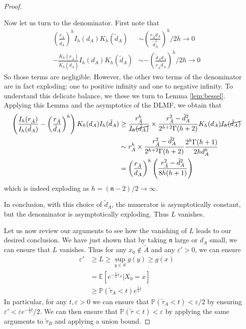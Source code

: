 \documentclass[english, aip, jcp, priprint, graphicx,floatfix]{revtex4-1}
\theoremstyle{plain}
\theoremstyle{definition}
\theoremstyle{plain}
\newcommand{\dimension}{{\mathfrak{n}}}
\begin{document}
\begin{proof}
\begin{itemize}
    Now let us turn to the denominator.  First note that 
    \begin{align*}
     \left( \frac{r_{\tilde{A}}}{\tilde{d}_A}\right)^h  
                I_h (d_A)K_h ( \tilde{d}_A) &\sim \left(\frac{r_{\tilde{A}} d_A}{\tilde d_A^2}\right)^h/2h \rightarrow 0\\
     - \frac{K_h ( r_{\tilde{A}})}{K_h ( \tilde{d}_A)} 
                I_h (d_A)K_h ( \tilde{d}_A) &\sim -\left(\frac{\tilde d_A d_A}{r_{\tilde A}\tilde d_A}\right)^h /2h\rightarrow 0
    \end{align*}
    So those terms are negligible.  However, the other two terms of the denominator are in fact exploding: one to positive infinity and one to negative infinity.  To understand this delicate balance, we these we turn to Lemma \ref{lem:bessel}.  Applying this Lemma and the asymptotics of the DLMF, we obtain that
    \begin{align*}
    \left( \frac{I_h ( r_{\tilde{A}})}{I_h ( \tilde{d}_A)} - \left(\frac{r_{\tilde{A}}}{\tilde{d}_A} \right)^h  \right)
                K_h ( d_A) I_h ( \tilde{d}_A) 
        &\geq \frac{r_{\tilde{A}}^h}{\cancel{I_h(\tilde{d}_A)}}\times\frac{r_{\tilde{A}}^{2} -\tilde{d}_A^{2}}{2^{h+2}\Gamma(h+2)} K_h ( d_A) \cancel{I_h ( \tilde{d}_A)} \\
        &\sim r_{\tilde{A}}^h\times\frac{r_{\tilde{A}}^{2} -\tilde{d}_A^{2}}{2^{h+2}\Gamma(h+2)} \frac{2^h \Gamma(h+1)}{2hd_A^h}  \\
        &=\left(\frac{r_{\tilde{A}}}{d_A} \right)^h \left(\frac{r_{\tilde A}^2 - \tilde d_A^2}{8h(h+1)}\right)
    \end{align*}
    which is indeed exploding as $h=(\dimension-2)/2 \rightarrow \infty$.  

    In conclusion, with this choice of $\tilde d_A$, the numerator is asymptotically constant, but the denominator is asymptotically exploding.  Thus $L$ vanishes.
\end{itemize}

Let us now review our arguments to see how the vanishing of $L$ leads to our desired conclusion.  We have just shown that by taking $\dimension$ large or $d_A$ small, we can ensure that $L$ vanishes.  Thus for any $x_0\notin \tilde A$ and any $\varepsilon'>0$, we can ensure
\begin{align*}
\varepsilon' & \geq L \geq \sup_{y \in S} g(y) \geq g(x) \\
            & = \mathbb{E}[e^{-\frac{1}{2}\tilde \tau_A}|X_0=x]\\
            & \geq \mathbb{P}(\tilde \tau_A < t) e^{\frac{1}{2} t}
\end{align*}
In particular, for any $t,\varepsilon>0$ we can ensure that $\mathbb{P}(\tilde \tau_A < t)<\varepsilon/2$ by ensuring $\varepsilon' < \varepsilon e^{-\frac{1}{2} t}/2$.  We can then ensure that $\mathbb{P}(\tilde \tau < t)<\varepsilon$ by applying the same arguments to $\tilde \tau_B$ and applying a union bound.

\end{proof}
\end{document}

